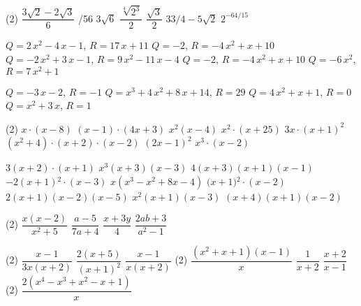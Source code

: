 \documentclass[11pt, a4paper, pdf]{article}
\let\frac\dfrac
\begin{document}
\begin{multicols}{2}
\begin{mylist}
 \vspace{2cm}
	\item
	\begin{tasks}(2)
		\task $\frac{3\sqrt{2}-2\sqrt{3}}{6}$ 
		/56
		\task  $3\sqrt{6} $    
		 \task  $\frac{\sqrt[{4}]{2^{3} } }{2} $   
		  \task  $\frac{\sqrt{3} }{2} $    
		  \task  $33/4-5\sqrt{2} $    
		   \task  $2^{-64/15} $  
	\end{tasks}



	\item 
	\begin{tasks} 
		\task $Q=2\,x^2-4\,x-1$, $R= 17\,x+11$ 
		\task $Q=-2$, $R= -4\,x^2+x+10$
		\task $Q=-2\,x^2+3\,x-1$, $R= 9\,x^2-11\,x-4$  
		\task $Q=-2$, $R= -4\,x^2+x+10 $
		\task $Q=-6\,x^2 $, $R=7\,x^2+1$  
	\end{tasks}
\vspace{1cm}
	\item 
\begin{tasks}
	\task $Q=-3\,x-2 $, $R=-1$  
	\task $Q= x^3+4\,x^2+8\,x+14 $, $R=29$  
	\task $Q=4\,x^2+x+1$, $R=0$  
	\task $Q= x^2+3\,x $, $R=1$ 
\end{tasks}

	\item 
\begin{tasks}(2) 
	\task  $x\cdot(x-8)$
	\task  $(x-1)\cdot (4x+3)$
	\task  $x^2(x-4)$
	\task  $ x^2 \cdot (x+25)$
	\task  $ 3 x \cdot (x+1)^2$
	\task  $ (x^2+4) \cdot (x+2) \cdot (x-2)$
	\task  $ (2x-1)^2$
	\task $x^3 \cdot (x-2)$
\end{tasks}

\vspace{1cm}
 	\item 
\begin{tasks}
	\task ${3(x+2)\cdot(x+1)}$  
	\task ${x{}^{3}(x+3)(x-3)}$     
	\task ${4(x+3)(x+1)(x-1)}$     
	\task ${-2(x+1){}^{2}\cdot(x-3)}$        
	\task ${x(x{}^{3}-x^{2}+8x-4)}$    
	\task $({x+1){}^{2}\cdot(x-2)}$
	 \task ${2(x+1)(x-2)(x-5)}$      
	  \task ${x^{2}(x+1)(x-3)}$         
	  \task ${(x+4)(x+1)(x-2)}$
\end{tasks}

\item  
\begin{tasks}(2)
	\task  $\frac{x(x-2)}{x^2+5}$
	\task $\frac{a-5}{7a+4}$
	\task $\frac{x+3y}{4}$
	\task $\frac{2ab+3}{a^2-1}$
\end{tasks}

\item  
\begin{tasks}(2)
	\task $\frac{x-1}{3x(x+2)} $  \task $\frac{2(x+5)}{(x+1)^{2} } $   \task  $\frac{x-1}{x(x+2)} $      \task*(2) $\frac{(x^{2} +x+1)(x-1)}{x^{} } $           \task $\frac{1}{x+2} $        \task $\frac{x+2}{x-1} $       \task*(2) $\frac{2(x^{4} -x^{3} +x^{2} -x+1)}{x} $
\end{tasks}


\end{mylist}
\end{multicols}
\end{document}
